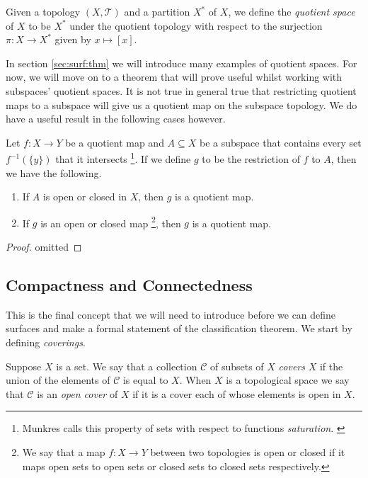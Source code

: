 \begin{defn}
  Given a topology $(X, \mathscr{T})$ and a partition $X^*$ of $X$, we
  define the \emph{quotient space} of $X$ to be $X^*$ under the
  quotient topology with respect to the surjection $\pi : X
  \rightarrow X^*$ given by $x \mapsto [x]$.
\end{defn}

In section \ref{sec:surf:thm} we will introduce many examples of
quotient spaces. For now, we will move on to a theorem that will prove
useful whilst working with subspaces' quotient spaces. It is not true
in general true that restricting quotient maps to a subspace will give
us a quotient map on the subspace topology. We do have a useful result %
in the following cases however.

\begin{thm}
  Let $f:X \rightarrow Y$ be a quotient map and $A \subseteq X$ be a
  subspace that contains every set $f^{-1}(\{ y \})$ that it
  intersects \footnote{Munkres calls this property of sets with
    respect to functions
    \emph{saturation}. \cite[p.~137]{munkres}}. If we define $g$ to be 
  the restriction of $f$ to $A$, then we have the following.
  \begin{enumerate} 
  \item If $A$ is open or closed in $X$, then $g$ is a quotient map.
  \item If $g$ is an open or closed map \footnote{We say that a map
      $f:X \rightarrow Y$ between two topologies is open or closed if
      it maps open sets to open sets or closed sets to closed sets
      respectively.}, then $g$ is a quotient map.
  \end{enumerate}
\end{thm}

\begin{proof}
  omitted
\end{proof}

\subsection{Compactness and Connectedness}
\label{sec:prelims:compact}

This is the final concept that we will need to introduce before we can
define surfaces and make a formal statement of the classification
theorem. We start by defining \emph{coverings}.

\begin{defn}
  Suppose $X$ is a set. We say that a collection $\mathscr{C}$ of
  subsets of $X$ \emph{covers} $X$ if the union of the elements of
  $\mathscr{C}$ is equal to $X$. When $X$ is a topological space we
  say that $\mathscr{C}$ is an \emph{open cover} of $X$ if it is a
  cover each of whose elements is open in $X$.
\end{defn}

